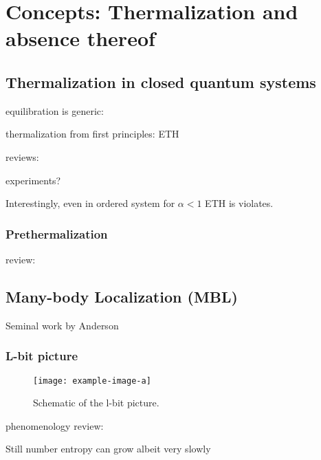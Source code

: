 \chapter{Concepts: Thermalization and absence thereof}\label{ch:another}
\section{Thermalization in closed quantum systems}
equilibration is generic: \cite{reimannFoundationStatisticalMechanics2008,lindenQuantumMechanicalEvolution2009}

thermalization from first principles: ETH \cite{deutschQuantumStatisticalMechanics1991,srednickiChaosQuantumThermalization1994,rigolThermalizationItsMechanism2008}

reviews: \cite{gogolinEquilibrationThermalisationEmergence2016,dalessioQuantumChaosEigenstate2016,deutschEigenstateThermalizationHypothesis2018,moriThermalizationPrethermalizationIsolated2018}

experiments?

Interestingly, even in ordered system for $\alpha<1$ ETH is violates\cite{sugimotoEigenstateThermalizationLongRange2022}.


\subsection{Prethermalization}

review: \cite{moriThermalizationPrethermalizationIsolated2018}

\section{Many-body Localization (MBL)}

Seminal work by Anderson \cite{andersonAbsenceDiffusionCertain1958}

\subsection{L-bit picture}

\begin{figure}[htb]
	\centering
	\texttt{[image: example-image-a]}
	\caption{Schematic of the l-bit picture.}
\end{figure}

phenomenology review: \cite{imbrieReviewLocalIntegrals2017}


Still number entropy can grow albeit very slowly\cite{kiefer-emmanouilidisEvidenceUnboundedGrowth2020,chavezUltraslowGrowthNumber2023}

